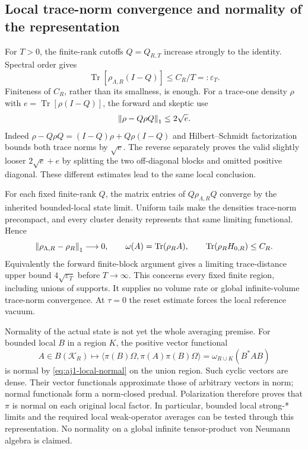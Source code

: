 \subsection{Local trace-norm convergence and normality of the representation}
For $T>0$, the finite-rank cutoffs $Q=Q_{R,T}$ increase strongly to the identity. Spectral order gives
\begin{equation}
 \operatorname{Tr}[\rho_{\Lambda,R}(I-Q)]\le C_R/T=:\varepsilon_T.
 \label{eq:aj1-tightness}
\end{equation}
Finiteness of $C_R$, rather than its smallness, is enough. For a trace-one density $\rho$ with $e=\operatorname{Tr}[\rho(I-Q)]$, the forward and skeptic use
\begin{equation}
 \left\lVert\rho-Q\rho Q\right\rVert_1\le2\sqrt e.
 \label{eq:aj1-trace-tail}
\end{equation}
Indeed $\rho-Q\rho Q=(I-Q)\rho+Q\rho(I-Q)$ and Hilbert--Schmidt factorization bounds both trace norms by $\sqrt e$. The reverse separately proves the valid slightly looser $2\sqrt e+e$ by splitting the two off-diagonal blocks and omitted positive diagonal. These different estimates lead to the same local conclusion.

For each fixed finite-rank $Q$, the matrix entries of $Q\rho_{\Lambda,R}Q$ converge by the inherited bounded-local state limit. Uniform tails make the densities trace-norm precompact, and every cluster density represents that same limiting functional. Hence
\begin{equation}
 \left\lVert\rho_{\Lambda,R}-\rho_R\right\rVert_1\longrightarrow0,
 \qquad\omega(A)=\operatorname{Tr}(\rho_RA),
 \qquad\operatorname{Tr}(\rho_RH_{0,R})\le C_R.
 \label{eq:aj1-local-normal}
\end{equation}
Equivalently the forward finite-block argument gives a limiting trace-distance upper bound $4\sqrt{\varepsilon_T}$ before $T\to\infty$. This concerns every fixed finite region, including unions of supports. It supplies no volume rate or global infinite-volume trace-norm convergence. At $\tau=0$ the reset estimate forces the local reference vacuum.

Normality of the actual state is not yet the whole averaging premise. For bounded local $B$ in a region $K$, the positive vector functional
\begin{equation}
 A\in B(\mathcal K_R)\longmapsto
 \langle\pi(B)\Omega,\pi(A)\pi(B)\Omega\rangle
 =\omega_{R\cup K}(B^*AB)
\end{equation}
is normal by \eqref{eq:aj1-local-normal} on the union region. Such cyclic vectors are dense. Their vector functionals approximate those of arbitrary vectors in norm; normal functionals form a norm-closed predual. Polarization therefore proves that $\pi$ is normal on each original local factor. In particular, bounded local strong-* limits and the required local weak-operator averages can be tested through this representation. No normality on a global infinite tensor-product von Neumann algebra is claimed.


